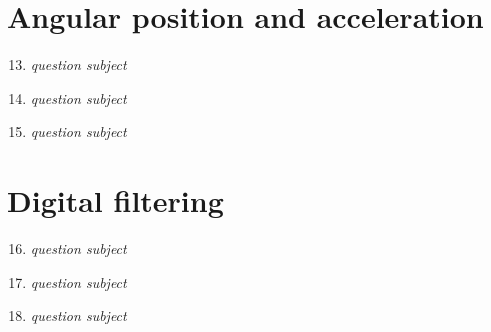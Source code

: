 \documentclass[a4paper,12pt]{article}
\begin{document}
\section{Angular position and acceleration}
\begin{enumerate}[label={\color{blue}\arabic*)}]
  \setcounter{enumi}{12}
  \item \emph{question subject}
  \item \emph{question subject}
  \item \emph{question subject}
\end{enumerate}

\section{Digital filtering}
\begin{enumerate}[label={\color{blue}\arabic*)}]
  \setcounter{enumi}{15}
  \item \emph{question subject}
  \item \emph{question subject}
  \item \emph{question subject}
\end{enumerate}
\end{document}
